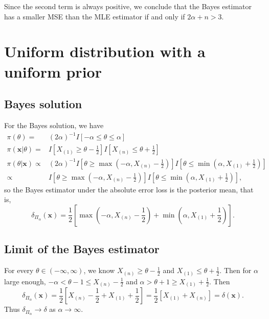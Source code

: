 \documentclass{article}
\begin{document}
Since the second term is always positive,
we conclude that the Bayes estimator has a smaller MSE than the MLE estimator
if and only if $2\alpha + n > 3$.

\section{Uniform distribution with a uniform prior}

\subsection{Bayes solution}

For the Bayes solution, we have
\begin{align*}
  \pi(\theta)
  = &  (2\alpha)^{-1} I[-\alpha \leq \theta \leq \alpha] \\
  \pi(\bm{x} | \theta)
  = & I[X_{(1)} \geq \theta - \frac{1}{2}]
      I[X_{(n)} \leq \theta + \frac{1}{2}] \\
  \pi(\theta | \bm{x} )
  \propto & (2\alpha)^{-1}
            I[\theta \geq \max(-\alpha, X_{(n)} - \frac{1}{2})]
            I[\theta \leq \min(\alpha, X_{(1)} + \frac{1}{2})] \\
  \propto & I[\theta \geq \max(-\alpha, X_{(n)} - \frac{1}{2})]
            I[\theta \leq \min(\alpha, X_{(1)} + \frac{1}{2})],
\end{align*}
so the Bayes estimator under the absolute error loss is the posterior mean,
that is,
\[
  \delta_{\Pi_\alpha}(\bm{x})
  = \frac{1}{2}
  [
  \max(-\alpha, X_{(n)} - \frac{1}{2}) +
  \min(\alpha, X_{(1)} + \frac{1}{2})
  ].
\]

\subsection{Limit of the Bayes estimator}

For every $\theta \in (-\infty, \infty)$,
we know $X_{(n)} \geq \theta - \frac{1}{2}$
and $X_{(1)} \leq \theta + \frac{1}{2}$.
Then for $\alpha$ large enough,
$-\alpha < \theta -1 \leq X_{(n)} - \frac{1}{2}$ and
$\alpha > \theta + 1 \geq X_{(1)} + \frac{1}{2}$.
Then
\[
  \delta_{\Pi_\alpha}(\bm{x})
  = \frac{1}{2}
  [
  X_{(n)} - \frac{1}{2}
  + X_{(1)} + \frac{1}{2}
  ]
  = \frac{1}{2}[ X_{(1)} + X_{(n)}]
  = \delta(\bm{x}).
\]
Thus $\delta_{\Pi_\alpha} \to \delta$ as $\alpha \to \infty$. 
\end{document}
